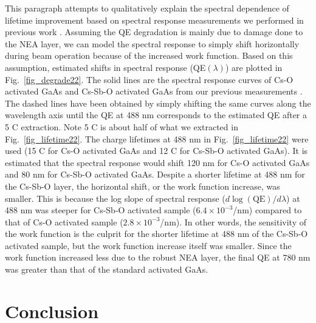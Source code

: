 This paragraph attempts to qualitatively explain the spectral dependence of lifetime improvement based on spectral response measurements we performed in previous work \cite{cultrera2020_LongLifetimePolarized,bae2020_ImprovedLifetimeHigh}.
Assuming the QE degradation is mainly due to damage done to the NEA layer, we can model the spectral response to simply shift horizontally during beam operation because of the increased work function.
Based on this assumption, estimated shifts in spectral response (QE$(\lambda)$) are plotted in Fig.~\ref{fig_degrade22}.
The solid lines are the spectral response curves of Cs-O activated GaAs and Cs-Sb-O activated GaAs from our previous measurements \cite{cultrera2020_LongLifetimePolarized,bae2020_ImprovedLifetimeHigh}.
The dashed lines have been obtained by simply shifting the same curves along the wavelength axis until the QE at 488 nm corresponds to the estimated QE after a 5 C extraction.
Note 5 C is about half of what we extracted in Fig.~\ref{fig_lifetime22}. The charge lifetimes at 488 nm in Fig.~\ref{fig_lifetime22} were used (15 C for Cs-O activated GaAs and 12 C for Cs-Sb-O activated GaAs).
It is estimated that the spectral response would shift 120 nm for Cs-O activated GaAs and 80 nm for Cs-Sb-O activated GaAs.
Despite a shorter lifetime at 488 nm for the Cs-Sb-O layer, the horizontal shift, or the work function increase, was smaller. This is because the log slope of spectral response ($d\log(\text{QE})/d\lambda$) at 488 nm was steeper for Cs-Sb-O activated sample ($6.4 \times 10^{-3}$/nm) compared to that of Cs-O activated sample ($2.8 \times 10^{-3}$/nm).
In other words, the sensitivity of the work function is the culprit for the shorter lifetime at 488 nm of the Cs-Sb-O activated sample, but the work function increase itself was smaller.
Since the work function increased less due to the robust NEA layer, the final QE at 780 nm was greater than that of the standard activated GaAs.






\section{Conclusion}

